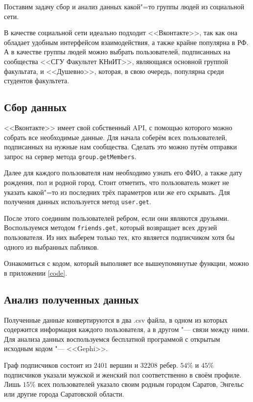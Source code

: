 Поставим задачу сбор и анализ данных какой"=то группы людей из социальной сети.

В качестве социальной сети идеально подходит <<Вконтакте>>, так как она обладает удобным интерфейсом взаимодействия, а также крайне популярна в РФ. А в качестве группы людей можно выбрать пользователей, подписанных на сообщества <<СГУ Факультет КНиИТ>>, являющаяся основной группой факультата, и <<Душевно>>, которая, в свою очередь, популярна среди студентов факультета.

\subsection{Сбор данных}
<<Вконтакте>> имеет свой собственный API\cite{vk}, с помощью которого можно собрать все необходимые данные. Для начала соберём всех пользователей, подписанных на нужные нам сообщества. Сделать это можно путём отправки запрос на сервер метода \texttt{group.getMembers}. 

Далее для каждого пользователя нам необходимо узнать его ФИО, а также дату рождения, пол и родной город. Стоит отметить, что пользователь может не указать какой"=то из последних трёх параметров или же его скрывать. Для получения данных используется метод \texttt{user.get}. 

После этого соединим пользователей ребром, если они являются друзьями. Воспользуемся методом \texttt{friends.get}, который возвращает всех друзей пользователя. Из них выберем только тех, кто является подписчиком хотя бы одного из выбранных пабликов.

Ознакомиться с кодом, который выполняет все вышеупомянутые функции, можно в приложении \ref{code}.

\subsection{Анализ полученных данных}
Полученные данные конвертируются в два .csv файла, в одном из которых содержится информация каждого пользователя, а в другом "--- связи между ними. Для анализа данных воспользуемся бесплатной программой с открытым исходным кодом "--- <<Gephi>>.

Граф подписчиков состоит из $2401$ вершин и $32208$ ребер.
$54\%$ и $45\%$ подписчиков указали мужской и женский пол соответственно в своём профиле. Лишь $15\%$ всех пользователей указало своим родным городом Саратов, Энгельс или другие города Саратовской области.

